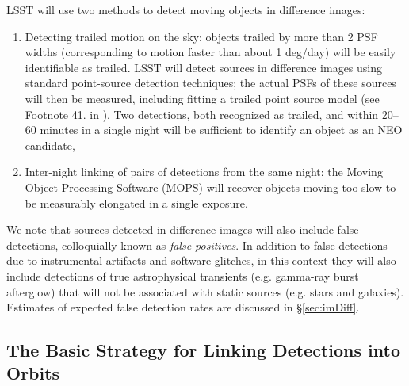 LSST will use two methods to detect moving objects in difference images:
\begin{enumerate}
\item Detecting trailed motion on the sky: objects trailed by more
  than 2 PSF widths (corresponding to motion faster than about 1
  deg/day) will be easily identifiable as trailed. LSST will detect sources in 
  difference images using standard point-source detection techniques; the actual
  PSFs of these sources will then be measured, including fitting a trailed
  point source model (see Footnote 41. in \citep[LSST Data Products Definition Document,][]{LSE-163}).
  Two detections, both recognized as trailed, and within 20--60 minutes in a single night
  will be sufficient to identify an object as an NEO candidate,
\item Inter-night linking of pairs of detections from the same night: the Moving Object 
Processing Software (MOPS) will recover objects moving too slow to be measurably elongated in a single exposure.
\end{enumerate}

We note that sources detected in difference images \citep[\DIASources in LSST parlance, see]{LSE-163}
will also include false detections, colloquially known as {\it false positives}.
In addition to false detections due to instrumental artifacts and software glitches,
in this context they will also include detections of true astrophysical transients
(e.g. gamma-ray burst afterglow) that will not be associated with static sources
(e.g. stars and galaxies). Estimates of expected false detection rates are discussed
in \S\ref{sec:imDiff}.



\subsection{The Basic Strategy for Linking Detections into Orbits}


